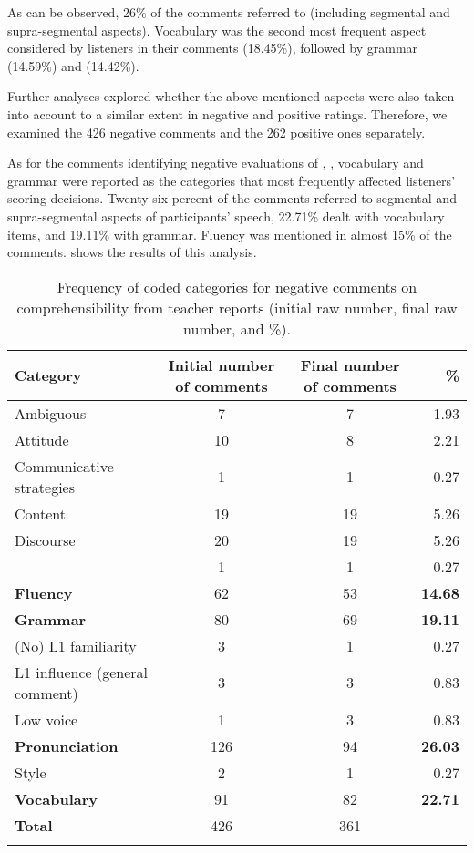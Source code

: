 \documentclass[output=paper]{langsci/langscibook}
\begin{document}
\newpage 
As can be observed, 26\% of the comments referred to  (including segmental and supra-segmental aspects). Vocabulary was the second most frequent aspect considered by listeners in their comments (18.45\%), followed by grammar (14.59\%) and  (14.42\%).  

Further analyses explored whether the above-mentioned aspects were also taken into account to a similar extent in negative and positive  ratings. Therefore, we examined the 426 negative comments and the 262 positive ones separately.

As for the comments identifying negative evaluations of , , vocabulary and grammar were reported as the categories that most frequently affected listeners’ scoring decisions. Twenty-six percent of the comments referred to segmental and supra-segmental aspects of participants’ speech, 22.71\% dealt with vocabulary items, and 19.11\% with grammar. Fluency was mentioned in almost 15\% of the comments.  shows the results of this analysis.

\begin{table}
\caption{Frequency of coded categories for negative comments on comprehensibility from teacher reports (initial raw number, final raw number, and \%).}
\label{tab:delrio:3}
\begin{tabularx}{\textwidth}{lSSr}
\lsptoprule
\bfseries Category & \bfseries Initial number of comments & \bfseries Final number of comments & \bfseries \%\\
\midrule
Ambiguous & 7 & 7 & 1.93\\
Attitude & 10 & 8 & 2.21\\
Communicative strategies & 1 & 1 & 0.27\\
Content & 19 & 19 & 5.26\\
Discourse & 20 & 19 & 5.26\\
  & 1 & 1 & 0.27\\
\textbf{Fluency} & 62 & 53 & \textbf{14.68}\\
\textbf{Grammar} & 80 & 69 & \textbf{19.11}\\
(No) {L1} familiarity & 3 & 1 & 0.27\\
L1 influence (general comment) & 3 & 3 & 0.83\\
Low voice & 1 & 3 & 0.83\\
\textbf{Pronunciation} & 126 & 94 & \textbf{26.03}\\
Style & 2 & 1 & 0.27\\
\textbf{Vocabulary} & 91 & 82 & \textbf{22.71}\\
\midrule
\textbf{Total} & 426 & 361 & \\
\lspbottomrule
\end{tabularx}
\end{table}
\end{document}
